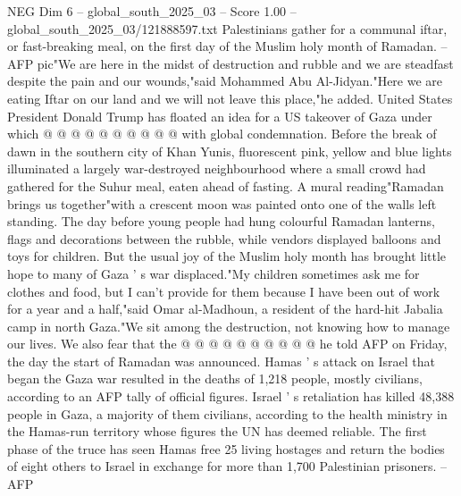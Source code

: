 \begin{textsample}{NEG Dim 6 – global\_south\_2025\_03 – Score 1.00 – global\_south\_2025\_03/121888597.txt}
Palestinians gather for a communal iftar, or fast-breaking meal, on the first day of the Muslim holy month of Ramadan. -- AFP pic"We are here in the midst of destruction and rubble and we are steadfast despite the pain and our wounds,"said Mohammed Abu Al-Jidyan."Here we are eating Iftar on our land and we will not leave this place,"he added.
United States President Donald Trump has floated an idea for a US takeover of Gaza under which @ @ @ @ @ @ @ @ @ @ with global condemnation.
Before the break of dawn in the southern city of Khan Yunis, fluorescent pink, yellow and blue lights illuminated a largely war-destroyed neighbourhood where a small crowd had gathered for the Suhur meal, eaten ahead of fasting.
A mural reading"Ramadan brings us together"with a crescent moon was painted onto one of the walls left standing.
The day before young people had hung colourful Ramadan lanterns, flags and decorations between the rubble, while vendors displayed balloons and toys for children.
But the usual joy of the Muslim holy month has brought little hope to many of Gaza ' s war displaced."My children sometimes ask me for clothes and food, but I can't provide for them because I have been out of work for a year and a half,"said Omar al-Madhoun, a resident of the hard-hit Jabalia camp in north Gaza."We sit among the destruction, not knowing how to manage our lives.
We also fear that the @ @ @ @ @ @ @ @ @ @ he told AFP on Friday, the day the start of Ramadan was announced.
Hamas ' s attack on Israel that began the Gaza war resulted in the deaths of 1,218 people, mostly civilians, according to an AFP tally of official figures.
Israel ' s retaliation has killed 48,388 people in Gaza, a majority of them civilians, according to the health ministry in the Hamas-run territory whose figures the UN has deemed reliable.
The first phase of the truce has seen Hamas free 25 living hostages and return the bodies of eight others to Israel in exchange for more than 1,700 Palestinian prisoners. -- AFP

\end{textsample}
